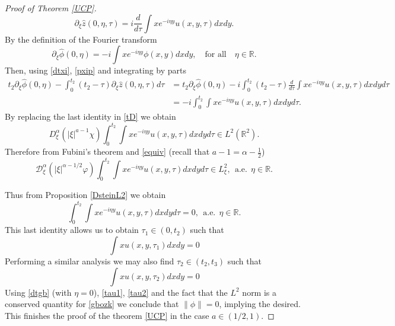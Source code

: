 \documentclass[reqno]{amsart}
\newcommand{\ha}{\hat{\phi}}
\newcommand{\dt}{D^{\alpha}_\xi}
\newcommand{\R}{\mathbb R}
\newcommand{\p}{\partial}
\numberwithin{equation}{section}
\begin{document}
\begin{proof}[Proof of Theorem \ref{UCP}]
\begin{equation}\label{dtxi}
\p_\xi \hat z (0,\eta,\tau)=i\frac{d}{d\tau}\int xe^{-i\eta y}u(x,y,\tau)dxdy.
\end{equation}
By the definition of the Fourier transform
\begin{equation}\label{pxip}
\p_\xi \ha(0,\eta)=-i\int xe^{-i\eta y}\phi(x,y)dxdy, \quad \mbox{for all} \quad \eta\in \R.
\end{equation}
Then, using \eqref{dtxi}, \eqref{pxip} and integrating by parts
\begin{equation*}\label{t2pxi}
\begin{split}
t_2\p_\xi \ha(0,\eta)-\int_0^{t_2} (t_2-\tau)\p_\xi \hat{z}(0,\eta,\tau)d\tau&=t_2\p_\xi \ha(0,\eta)-i\int_0^{t_2}(t_2-\tau)\frac{d}{d\tau}\int xe^{-i\eta y}u(x,y,\tau)dxdyd\tau\\
&=-i\int_0^{t_2}\int x e^{-i\eta y}u(x,y,\tau)dxdyd\tau.
\end{split}
\end{equation*}
By replacing the last identity in \eqref{tD} we obtain
\begin{equation*}
\dt (|\xi|^{a-1}\chi) \int_{0}^{t_2}\int x e^{-i\eta y}u(x,y,\tau)dxdyd\tau \in L^2(\R^2).
\end{equation*}
Therefore from Fubini's theorem and \eqref{equiv} (recall that $a-1=\alpha-\frac{1}{2}$)
\begin{equation*}
\mathcal{D}_\xi^{\alpha}(|\xi|^{\alpha-1/2}\varphi) \int_{0}^{t_2}\int x e^{-i\eta y}u(x,y,\tau)dxdyd\tau \in L^2_\xi, \ \ \mbox{a.e.} \ \ \eta\in \R.
\end{equation*}

Thus from Proposition \ref{DsteinL2} we obtain
\begin{equation}\label{tauu}
\int_{0}^{t_2}\int x e^{-i\eta y}u(x,y,\tau)dxdyd\tau=0, \ \ \mbox{a.e.} \ \ \eta\in \R.
\end{equation}
This last identity allows us to obtain $\tau_1\in(0,t_2)$ such that
\begin{equation}\label{tau1}
\int x u(x,y,\tau_1)dxdy=0
\end{equation}
Performing a similar analysis we may also find $\tau_2\in(t_2,t_3)$ such that
\begin{equation}\label{tau2}
\int x u(x,y,\tau_2)dxdy=0
\end{equation}
Using \eqref{dtgb} (with $\eta=0$), \eqref{tau1}, \eqref{tau2} and the fact that the $L^2$ norm is a conserved quantity for \eqref{gbozk} we conclude that $\|\phi\|=0$, implying the desired. This finishes the proof of the theorem \ref{UCP} in the case $a\in(1/2,1)$.


\end{proof}
\end{document}
